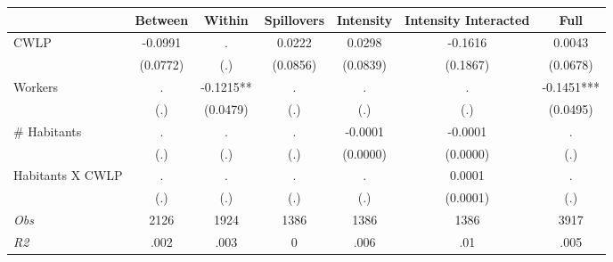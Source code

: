 \begin{tabular}{l*{6}{c}}\hline&\multicolumn{1}{c}{Between}&\multicolumn{1}{c}{Within}&\multicolumn{1}{c}{Spillovers}&\multicolumn{1}{c}{Intensity}&\multicolumn{1}{c}{Intensity Interacted}&\multicolumn{1}{c}{Full}\\ \hline 
CWLP & -0.0991 & . & 0.0222 & 0.0298 & -0.1616 & 0.0043 \\
 & (0.0772) & (.) & (0.0856) & (0.0839) & (0.1867) & (0.0678) \\
Workers & . & -0.1215** & . & . & . & -0.1451*** \\
 & (.) & (0.0479) & (.) & (.) & (.) & (0.0495) \\
\# Habitants & . & . & . & -0.0001 & -0.0001 & . \\
 & (.) & (.) & (.) & (0.0000) & (0.0000) & (.) \\
Habitants X CWLP & . & . & . & . & 0.0001 & . \\
 & (.) & (.) & (.) & (.) & (0.0001) & (.) \\
\hline \textit{Obs} & 2126 & 1924 & 1386 & 1386 & 1386 & 3917 \\ \textit{R2} & .002 & .003 & 0 & .006 & .01 & .005 \\ \hline \end{tabular}
